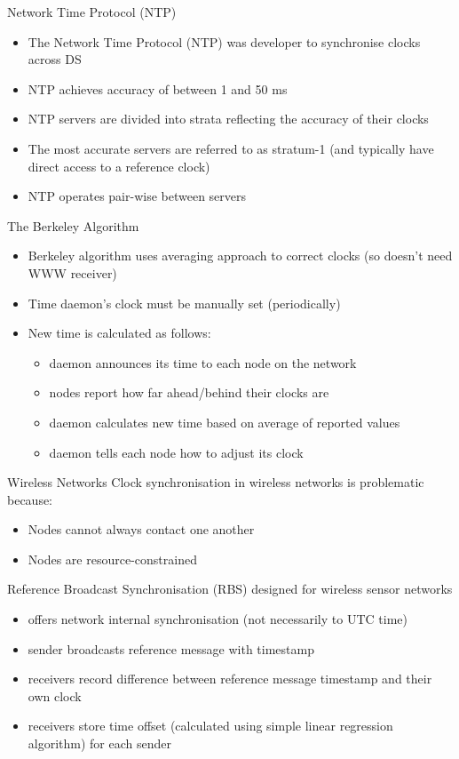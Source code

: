 \begin{note}{Network Time Protocol (NTP)}
	\begin{itemize}
		\item The Network Time Protocol (NTP) was developer to synchronise clocks across DS
		\item NTP achieves accuracy of between 1 and 50 ms
		\item NTP servers are divided into strata reflecting the accuracy of their clocks
		\item The most accurate servers are referred to as stratum-1 (and typically have direct access to a reference clock)
		\item NTP operates pair-wise between servers	
	\end{itemize}
\end{note}

\begin{note}{The Berkeley Algorithm}
	\begin{itemize}
		\item Berkeley algorithm uses averaging approach to correct clocks (so doesn't need WWW receiver)
		\item Time daemon's clock must be manually set (periodically)
		\item New time is calculated as follows:
		\begin{itemize}
			\item daemon announces its time to each node on the network
			\item nodes report how far ahead/behind their clocks are
			\item daemon calculates new time based on average of reported values
			\item daemon tells each node how to adjust its clock
		\end{itemize}
	\end{itemize}
\end{note}

\begin{note}{Wireless Networks}
	Clock synchronisation in wireless networks is problematic because:
	\begin{itemize}
		\item Nodes cannot always contact one another
		\item Nodes are resource-constrained	
	\end{itemize}
	Reference Broadcast Synchronisation (RBS) designed for wireless sensor networks
	\begin{itemize}
		\item offers network internal synchronisation (not necessarily to UTC time)
		\item sender broadcasts reference message with timestamp
		\item receivers record difference between reference message timestamp and their own clock
		\item receivers store time offset (calculated using simple linear regression algorithm) for each sender
	\end{itemize}
\end{note}

